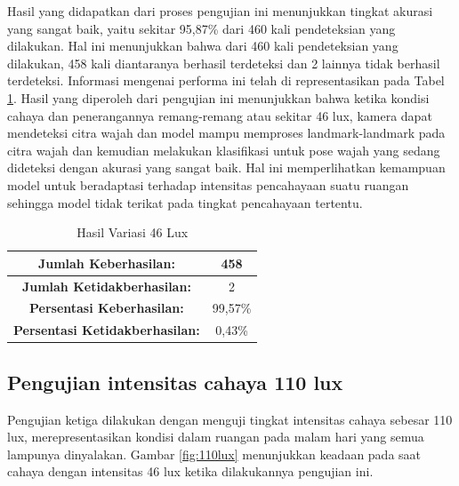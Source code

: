 Hasil yang didapatkan dari proses pengujian ini menunjukkan tingkat akurasi yang sangat baik, yaitu sekitar 95,87\% dari 460 kali pendeteksian yang dilakukan. Hal ini menunjukkan bahwa dari 460 kali pendeteksian yang dilakukan, 458 kali diantaranya berhasil terdeteksi dan 2 lainnya tidak berhasil terdeteksi. Informasi mengenai performa ini telah di representasikan pada Tabel \ref{tb:46lux}. Hasil yang diperoleh dari pengujian ini menunjukkan bahwa ketika kondisi cahaya dan penerangannya remang-remang atau sekitar 46 lux, kamera dapat mendeteksi citra wajah dan model mampu memproses landmark-landmark pada citra wajah dan kemudian melakukan klasifikasi untuk pose wajah yang sedang dideteksi dengan akurasi yang sangat baik. Hal ini memperlihatkan kemampuan model untuk beradaptasi terhadap intensitas pencahayaan suatu ruangan sehingga model tidak terikat pada tingkat pencahayaan tertentu.

\begin{longtable}{|c|c|}
  \caption{Hasil Variasi 46 Lux}
  \label{tb:46lux}\\
  \hline
  \cellcolor[HTML]{C0C0C0}
  \textbf{Jumlah Keberhasilan:} & 458\\
  \hline
  \cellcolor[HTML]{C0C0C0}
  \textbf{Jumlah Ketidakberhasilan:} & 2\\
  \hline
  \cellcolor[HTML]{C0C0C0}
  \textbf{Persentasi Keberhasilan:} & 99,57\% \\
  \hline
  \cellcolor[HTML]{C0C0C0}
  \textbf{Persentasi Ketidakberhasilan:} & 0,43\% \\
  \hline
  \end{longtable}

\subsection{Pengujian intensitas cahaya 110 lux}
Pengujian ketiga dilakukan dengan menguji tingkat intensitas cahaya sebesar 110 lux, merepresentasikan kondisi dalam ruangan pada malam hari yang semua lampunya dinyalakan. Gambar \ref{fig:110lux} menunjukkan keadaan pada saat cahaya dengan intensitas 46 lux ketika dilakukannya pengujian ini.



